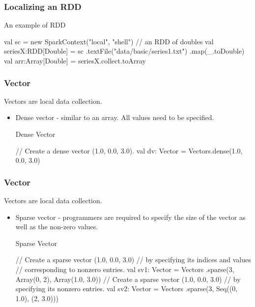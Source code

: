 \documentclass{beamer}
\newcommand{\beb}{\begin{exampleblock}}
\newcommand{\eeb}{\end{exampleblock}}
\begin{document}


\begin{frame}[fragile]
\frametitle{Localizing an RDD}

\beb{An example of RDD}
\begin{code}
val sc = new SparkContext("local", "shell")	
// an RDD of doubles 
val seriesX:RDD[Double] = sc
  .textFile("data/basic/series1.txt")
  .map(_.toDouble)
val arr:Array[Double] = seriesX.collect.toArray
\end{code}
\eeb

\end{frame}




\begin{frame}[fragile]
\frametitle{Vector}

Vectors are local data collection.
\begin{itemize}
\item Dense vector - similar to an array. All values need to be specified.
\beb{Dense Vector}
\begin{code}
// Create a dense vector (1.0, 0.0, 3.0).
val dv: Vector = Vectors.dense(1.0, 0.0, 3.0)
\end{code}
\eeb
\end{itemize}
\end{frame}



\begin{frame}[fragile]
\frametitle{Vector}

Vectors are local data collection.
\begin{itemize}
\item Sparse vector - programmers are required to specify the size of
  the vector  as well as the non-zero values.
\beb{Sparse Vector}
\begin{code}
// Create a sparse vector (1.0, 0.0, 3.0) 
// by specifying its indices and values 
// corresponding to nonzero entries.
val sv1: Vector = Vectors
  .sparse(3, Array(0, 2), Array(1.0, 3.0))
// Create a sparse vector (1.0, 0.0, 3.0) 
// by specifying its nonzero entries.
val sv2: Vector = Vectors
  .sparse(3, Seq((0, 1.0), (2, 3.0)))
\end{code}
\eeb  
\end{itemize}
\end{frame}
\end{document}
